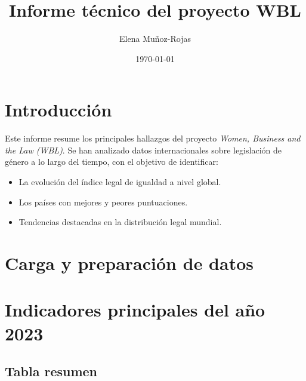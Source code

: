 \documentclass[11pt]{article}\usepackage[]{graphicx}\usepackage[]{xcolor}
\title{Informe técnico del proyecto WBL}
\author{Elena Muñoz-Rojas}
\date{\today}
\begin{document}
\maketitle
\tableofcontents
\newpage

\section{Introducción}

Este informe resume los principales hallazgos del proyecto \textit{Women, Business and the Law (WBL)}. Se han analizado datos internacionales sobre legislación de género a lo largo del tiempo, con el objetivo de identificar:

\begin{itemize}
  \item La evolución del índice legal de igualdad a nivel global.
  \item Los países con mejores y peores puntuaciones.
  \item Tendencias destacadas en la distribución legal mundial.
\end{itemize}

\section{Carga y preparación de datos}



\section{Indicadores principales del año 2023}

\subsection{Tabla resumen}

\begin{table}[!h]
\centering
\caption{\label{tab:tabla_resumen}Resumen del índice WBL en el año más reciente}
\centering
{}
\end{table}
\end{document}
